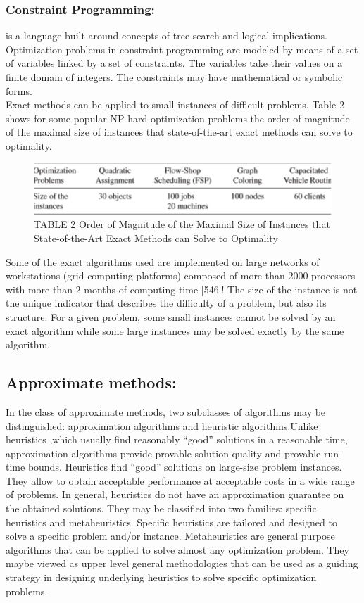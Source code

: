\subsubsection{Constraint Programming:}
is a language built around concepts of tree search and logical implications. Optimization problems in constraint programming are modeled by means of a set of variables linked by a set of constraints. The variables take their values on a finite domain of integers. The constraints may have mathematical or symbolic forms.\\
Exact methods can be applied to small instances of difficult problems. Table 2 shows for some popular NP hard optimization problems the order of magnitude of the maximal size of instances that state-of-the-art exact methods can solve to optimality.
\begin{figure}[H]
	\begin{center}
		\includegraphics[scale=0.7]	{table2.png}
		\caption{TABLE 2 Order of Magnitude of the Maximal Size of Instances that State-of-the-Art Exact Methods can Solve to Optimality}
	\end{center}
\end{figure}
Some of the exact algorithms used are implemented on large networks of workstations (grid computing platforms) composed of more than 2000 processors with more than 2 months of computing time [546]! The size of the instance is not the unique indicator that describes the difficulty of a problem, but also its structure. For a given problem, some small instances cannot be solved by an exact algorithm while some large instances may be solved exactly by the same algorithm.
\subsection{Approximate	methods:}
In the class of approximate methods, two subclasses of algorithms may be distinguished: approximation algorithms and heuristic algorithms.Unlike heuristics ,which usually find reasonably “good” solutions in a reasonable time, approximation algorithms provide provable solution quality and provable run-time bounds. Heuristics find “good” solutions on large-size problem instances. They allow to obtain acceptable performance at acceptable costs in a wide range of problems. In general, heuristics do not have an approximation guarantee on the obtained solutions. They may be classified into two families: specific heuristics and metaheuristics. Specific heuristics are tailored and designed to solve a specific problem and/or instance. Metaheuristics are general purpose algorithms that can be applied to solve almost any optimization problem. They maybe viewed as upper level general methodologies that can be used as a guiding strategy in designing underlying heuristics to solve specific optimization problems.
